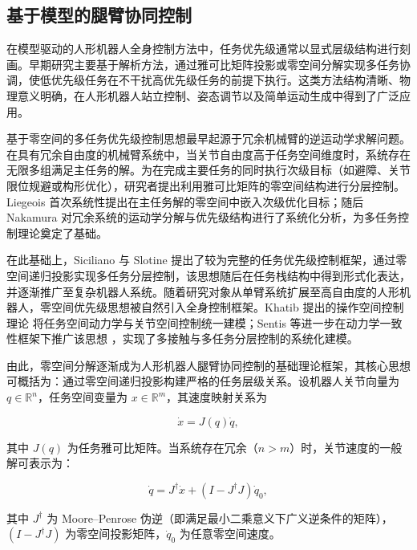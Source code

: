 \subsection{基于模型的腿臂协同控制}

在模型驱动的人形机器人全身控制方法中，任务优先级通常以显式层级结构进行刻画\cite{slotine1991general,liegeois1977automatic,nakamura1990advanced}。早期研究主要基于解析方法，通过雅可比矩阵投影或零空间分解实现多任务协调，使低优先级任务在不干扰高优先级任务的前提下执行\cite{梁国祥2024,chiaverini2002singularity,kanoun2011kinematic}。这类方法结构清晰、物理意义明确，在人形机器人站立控制、姿态调节以及简单运动生成中得到了广泛应用。

基于零空间的多任务优先级控制思想最早起源于冗余机械臂的逆运动学求解问题。在具有冗余自由度的机械臂系统中，当关节自由度高于任务空间维度时，系统存在无限多组满足主任务的解。为在完成主要任务的同时执行次级目标（如避障、关节限位规避或构形优化），研究者提出利用雅可比矩阵的零空间结构进行分层控制。Liegeois \cite{Liegeois1977} 首次系统性提出在主任务解的零空间中嵌入次级优化目标；随后 Nakamura \cite{Nakamura1987} 对冗余系统的运动学分解与优先级结构进行了系统化分析，为多任务控制理论奠定了基础。

在此基础上，Siciliano 与 Slotine \cite{Siciliano1991} 提出了较为完整的任务优先级控制框架，通过零空间递归投影实现多任务分层控制，该思想随后在任务栈结构中得到形式化表达，并逐渐推广至复杂机器人系统。随着研究对象从单臂系统扩展至高自由度的人形机器人，零空间优先级思想被自然引入全身控制框架。Khatib 提出的操作空间控制理论\cite{Khatib1987, Khatib2004} 将任务空间动力学与关节空间控制统一建模；Sentis 等进一步在动力学一致性框架下推广该思想 \cite{Sentis2007}，实现了多接触与多任务分层控制的系统化建模。

由此，零空间分解逐渐成为人形机器人腿臂协同控制的基础理论框架，其核心思想可概括为：通过零空间递归投影构建严格的任务层级关系。设机器人关节向量为 $q \in \mathbb{R}^n$，任务空间变量为 $x \in \mathbb{R}^m$，其速度映射关系为

\begin{equation}
	\dot{x} = J(q)\dot{q},
\end{equation}

其中 $J(q)$ 为任务雅可比矩阵。当系统存在冗余（$n > m$）时，关节速度的一般解可表示为：

\begin{equation}
	\dot{q} = J^\dagger \dot{x} + (I - J^\dagger J)\dot{q}_0,
\end{equation}


其中 $J^\dagger$ 为 Moore–Penrose 伪逆（即满足最小二乘意义下广义逆条件的矩阵），$(I - J^\dagger J)$ 为零空间投影矩阵，$\dot{q}_0$ 为任意零空间速度。


